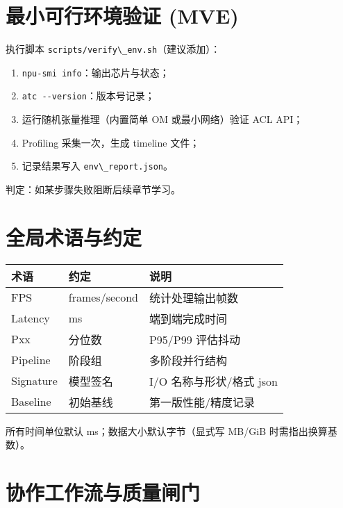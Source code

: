 \section{最小可行环境验证
(MVE)}\label{ux6700ux5c0fux53efux884cux73afux5883ux9a8cux8bc1-mve}

执行脚本 \passthrough{\lstinline!scripts/verify\_env.sh!}（建议添加）：

\begin{enumerate}
\def\labelenumi{\arabic{enumi}.}
\tightlist
\item
  \passthrough{\lstinline!npu-smi info!}：输出芯片与状态；
\item
  \passthrough{\lstinline!atc --version!}：版本号记录；
\item
  运行随机张量推理（内置简单 OM 或最小网络）验证 ACL API；
\item
  Profiling 采集一次，生成 timeline 文件；
\item
  记录结果写入 \passthrough{\lstinline!env\_report.json!}。
\end{enumerate}

判定：如某步骤失败阻断后续章节学习。

\section{全局术语与约定}\label{ux5168ux5c40ux672fux8bedux4e0eux7ea6ux5b9a}

\begin{longtable}[]{@{}lll@{}}
\toprule\noalign{}
术语 & 约定 & 说明 \\
\midrule\noalign{}
\endhead
\bottomrule\noalign{}
\endlastfoot
FPS & frames/second & 统计处理输出帧数 \\
Latency & ms & 端到端完成时间 \\
Pxx & 分位数 & P95/P99 评估抖动 \\
Pipeline & 阶段组 & 多阶段并行结构 \\
Signature & 模型签名 & I/O 名称与形状/格式 json \\
Baseline & 初始基线 & 第一版性能/精度记录 \\
\end{longtable}

所有时间单位默认 ms；数据大小默认字节（显式写 MB/GiB
时需指出换算基数）。

\section{协作工作流与质量闸门}\label{ux534fux4f5cux5de5ux4f5cux6d41ux4e0eux8d28ux91cfux95f8ux95e8}

